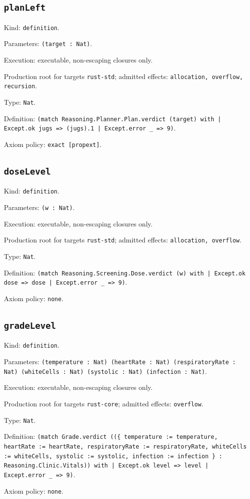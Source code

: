 \documentclass[11pt]{article}
\begin{document}
\subsection*{\texttt{planLeft}}
\noindent Kind: \texttt{definition}.\par
\noindent Parameters: \texttt{(target : Nat)}.\par
\noindent Execution: executable, non-escaping closures only.\par
\noindent Production root for targets \texttt{rust-std}; admitted effects: \texttt{allocation, overflow, recursion}.\par
\noindent Type: \texttt{Nat}.\par
\noindent Definition: \texttt{(match Reasoning.Planner.Plan.verdict (target) with | Except.ok jugs => (jugs).1 | Except.error \_ => 9)}.\par
\noindent Axiom policy: \texttt{exact [propext]}.\par
\subsection*{\texttt{doseLevel}}
\noindent Kind: \texttt{definition}.\par
\noindent Parameters: \texttt{(w : Nat)}.\par
\noindent Execution: executable, non-escaping closures only.\par
\noindent Production root for targets \texttt{rust-std}; admitted effects: \texttt{allocation, overflow}.\par
\noindent Type: \texttt{Nat}.\par
\noindent Definition: \texttt{(match Reasoning.Screening.Dose.verdict (w) with | Except.ok dose => dose | Except.error \_ => 9)}.\par
\noindent Axiom policy: \texttt{none}.\par
\subsection*{\texttt{gradeLevel}}
\noindent Kind: \texttt{definition}.\par
\noindent Parameters: \texttt{(temperature : Nat) (heartRate : Nat) (respiratoryRate : Nat) (whiteCells : Nat) (systolic : Nat) (infection : Nat)}.\par
\noindent Execution: executable, non-escaping closures only.\par
\noindent Production root for targets \texttt{rust-core}; admitted effects: \texttt{overflow}.\par
\noindent Type: \texttt{Nat}.\par
\noindent Definition: \texttt{(match Grade.verdict ((\{ temperature := temperature, heartRate := heartRate, respiratoryRate := respiratoryRate, whiteCells := whiteCells, systolic := systolic, infection := infection \} : Reasoning.Clinic.Vitals)) with | Except.ok level => level | Except.error \_ => 9)}.\par
\noindent Axiom policy: \texttt{none}.\par
\end{document}
